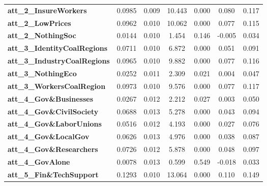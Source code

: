 \begin{center}
\begin{tabular}{lcccccc}
\textbf{att\_2\_InsureWorkers}       &       0.0985  &        0.009     &    10.443  &         0.000        &        0.080    &        0.117     \\
\textbf{att\_2\_LowPrices}           &       0.0962  &        0.010     &    10.062  &         0.000        &        0.077    &        0.115     \\
\textbf{att\_2\_NothingSoc}          &       0.0144  &        0.010     &     1.454  &         0.146        &       -0.005    &        0.034     \\
\textbf{att\_3\_IdentityCoalRegions} &       0.0711  &        0.010     &     6.872  &         0.000        &        0.051    &        0.091     \\
\textbf{att\_3\_IndustryCoalRegions} &       0.0965  &        0.010     &     9.882  &         0.000        &        0.077    &        0.116     \\
\textbf{att\_3\_NothingEco}          &       0.0252  &        0.011     &     2.309  &         0.021        &        0.004    &        0.047     \\
\textbf{att\_3\_WorkersCoalRegion}   &       0.0973  &        0.010     &     9.576  &         0.000        &        0.077    &        0.117     \\
\textbf{att\_4\_Gov\&Businesses}     &       0.0267  &        0.012     &     2.212  &         0.027        &        0.003    &        0.050     \\
\textbf{att\_4\_Gov\&CivilSociety}   &       0.0688  &        0.013     &     5.278  &         0.000        &        0.043    &        0.094     \\
\textbf{att\_4\_Gov\&LaborUnions}    &       0.0516  &        0.012     &     4.193  &         0.000        &        0.027    &        0.076     \\
\textbf{att\_4\_Gov\&LocalGov}       &       0.0626  &        0.013     &     4.976  &         0.000        &        0.038    &        0.087     \\
\textbf{att\_4\_Gov\&Researchers}    &       0.0726  &        0.012     &     5.878  &         0.000        &        0.048    &        0.097     \\
\textbf{att\_4\_GovAlone}            &       0.0078  &        0.013     &     0.599  &         0.549        &       -0.018    &        0.033     \\
\textbf{att\_5\_Fin\&TechSupport}    &       0.1293  &        0.010     &    13.064  &         0.000        &        0.110    &        0.149     \\

\end{tabular}
\end{center}
